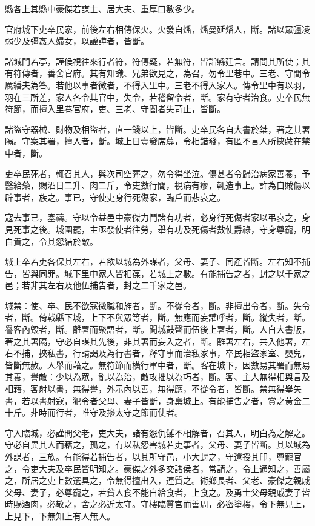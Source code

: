 \begin{pinyinscope}
縣各上其縣中豪傑若謀士、居大夫、重厚口數多少。

官府城下吏卒民家，前後左右相傳保火。火發自燔，燔曼延燔人，斷。諸以眾彊凌弱少及彊姦人婦女，以讙譁者，皆斷。

諸城門若亭，謹候視往來行者符，符傳疑，若無符，皆詣縣廷言。請問其所使；其有符傳者，善舍官府。其有知識、兄弟欲見之，為召，勿令里巷中。三老、守閭令厲繕夫為答。若他以事者微者，不得入里中。三老不得入家人。傳令里中有以羽，羽在三所差，家人各令其官中，失令，若稽留令者，斷。家有守者治食。吏卒民無符節，而擅入里巷官府，吏、三老、守閭者失苛止，皆斷。

諸盜守器械、財物及相盜者，直一錢以上，皆斷。吏卒民各自大書於桀，著之其署隔。守案其署，擅入者，斷。城上日壹發席蓐，令相錯發，有匿不言人所挾藏在禁中者，斷。

吏卒民死者，輒召其人，與次司空葬之，勿令得坐泣。傷甚者令歸治病家善養，予醫給藥，賜酒日二升、肉二斤，令吏數行閭，視病有瘳，輒造事上。詐為自賊傷以辟事者，族之。事已，守使吏身行死傷家，臨戶而悲哀之。

寇去事已，塞禱。守以令益邑中豪傑力鬥諸有功者，必身行死傷者家以弔哀之，身見死事之後。城圍罷，主亟發使者往勞，舉有功及死傷者數使爵祿，守身尊寵，明白貴之，令其怨結於敵。

城上卒若吏各保其左右，若欲以城為外謀者，父母、妻子、同產皆斷。左右知不捕告，皆與同罪。城下里中家人皆相葆，若城上之數。有能捕告之者，封之以千家之邑；若非其左右及他伍捕告者，封之二千家之邑。

城禁：使、卒、民不欲寇微職和旌者，斷。不從令者，斷。非擅出令者，斷。失令者，斷。倚戟縣下城，上下不與眾等者，斷。無應而妄讙呼者，斷。縱失者，斷。譽客內毀者，斷。離署而聚語者，斷。聞城鼓聲而伍後上署者，斷。人自大書版，著之其署隔，守必自謀其先後，非其署而妄入之者，斷。離署左右，共入他署，左右不捕，挾私書，行請謁及為行書者，釋守事而治私家事，卒民相盜家室、嬰兒，皆斷無赦。人舉而藉之。無符節而橫行軍中者，斷。客在城下，因數易其署而無易其養，譽敵：少以為眾，亂以為治，敵攻拙以為巧者，斷。客、主人無得相與言及相藉，客射以書，無得譽，外示內以善，無得應，不從令者，皆斷。禁無得舉矢書，若以書射寇，犯令者父母、妻子皆斷，身梟城上。有能捕告之者，賞之黃金二十斤。非時而行者，唯守及摻太守之節而使者。

守入臨城，必謹問父老，吏大夫，諸有怨仇讎不相解者，召其人，明白為之解之。守必自異其人而藉之，孤之，有以私怨害城若吏事者，父母、妻子皆斷。其以城為外謀者，三族。有能得若捕告者，以其所守邑，小大封之，守還授其印，尊寵官之，令吏大夫及卒民皆明知之。豪傑之外多交諸侯者，常請之，令上通知之，善屬之，所居之吏上數選具之，令無得擅出入，連質之。術鄉長者、父老、豪傑之親戚父母、妻子，必尊寵之，若貧人食不能自給食者，上食之。及勇士父母親戚妻子皆時賜酒肉，必敬之，舍之必近太守。守樓臨質宮而善周，必密塗樓，令下無見上，上見下，下無知上有人無人。


\end{pinyinscope}
